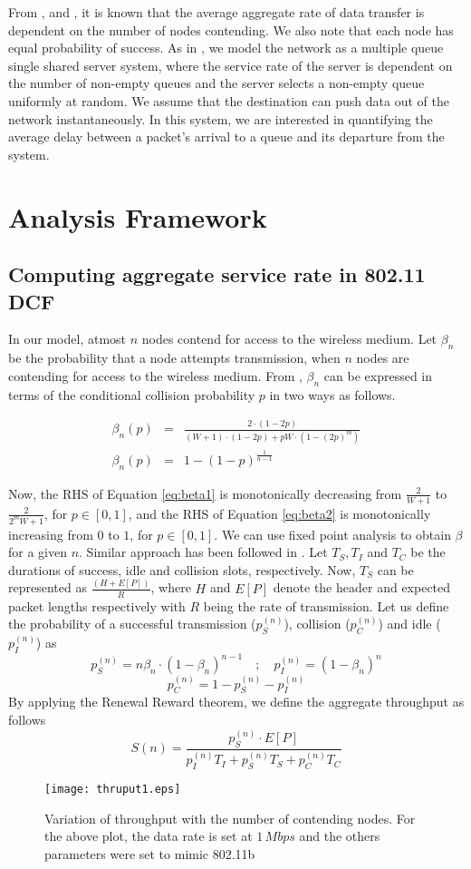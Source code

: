 \documentclass[10pt, conference, compsocconf]{IEEEtran}
\begin{document}
From \cite{bianchi}, \cite{tay} and \cite{akumar}, it is known that the average aggregate rate of data transfer is dependent on the number of nodes contending. We also note that each node has equal probability of success. As in \cite{tobagi}, we model the network as a multiple queue single shared server system, where the service rate of the server is dependent on the number of non-empty queues and the server selects a non-empty queue uniformly at random. We assume that the destination can push data out of the network instantaneously. In this system, we are interested in quantifying the average delay between a packet's arrival to a queue and its departure from the system. 

\section{\large{Analysis Framework}}
\label{analysis}

\subsection{Computing aggregate service rate in 802.11 DCF}
\label{bia}
In our model, atmost $n$ nodes contend for access to the wireless medium. Let $\beta_n$ be the probability that a node attempts transmission, when $n$ nodes are contending for access to the wireless medium. From \cite{bianchi}, $\beta_n$ can be expressed in terms of the conditional collision probability $p$ in two ways as follows.

\begin{eqnarray}
\beta_n(p) &=& \frac{2 \cdot (1-2p)}{(W+1) \cdot (1-2p) + pW \cdot (1 - {(2p)}^m)} \label{eq:beta1} \\
\beta_n(p) &=& 1 - (1-p)^{\frac{1}{n-1}} \label{eq:beta2}
\end{eqnarray}


Now, the RHS of Equation \eqref{eq:beta1} is monotonically decreasing from $\frac{2}{W+1}$ to $\frac{2}{2^mW+1}$, for $p \in [0,1]$, and the RHS of Equation \eqref{eq:beta2} is monotonically increasing from $0$ to $1$, for $p \in [0,1]$. We can use fixed point analysis to obtain $\beta$ for a given $n$. Similar approach has been followed in \cite{akumar}. Let $T_S, T_I$ and $T_C$ be the durations of success, idle and collision slots, respectively. Now, $T_S$ can be represented as $\frac{(H + E[P])}{R}$, where $H$ and $E[P]$ denote the header and expected packet lengths respectively with $R$ being the rate of transmission. Let us define the probability of a successful transmission ($p^{(n)}_S$), collision ($p^{(n)}_C$) and idle ($p^{(n)}_I$) as
$$ p^{(n)}_S = n\beta_n \cdot (1-\beta_n)^{n-1} \quad ;\quad p^{(n)}_I = (1-\beta_n)^n $$
$$ p^{(n)}_C = 1-  p^{(n)}_S - p^{(n)}_I$$	
By applying the Renewal Reward theorem, we define the aggregate throughput as follows
$$S(n) = \frac{p^{(n)}_S\cdot E[P]}{p^{(n)}_IT_I + p^{(n)}_ST_S + p^{(n)}_CT_C}$$
\begin{figure}[h]
\centering
\texttt{[image: thruput1.eps]}
\caption {Variation of throughput with the number of contending nodes. For the above plot, the data rate is set at $1\,Mbps$ and the others parameters were set to mimic 802.11b}
\label{fig:thruput}
\end{figure}
\end{document}
